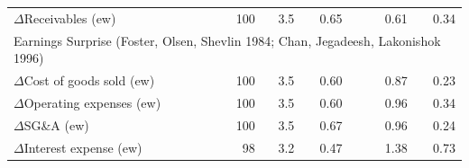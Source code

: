 \begin{tabular}{lrrrlrr}
$\Delta$Receivables (ew) & 100 & 3.5 & 0.65 &  & 0.61 & 0.34 \bigstrut[b] \\ 
\multicolumn{7}{l}{Earnings Surprise (Foster, Olsen, Shevlin 1984; Chan, Jegadeesh, Lakonishok 1996)} \\ \hline
$\Delta$Cost of goods sold (ew) & 100 & 3.5 & 0.60 &  & 0.87 & 0.23\\
$\Delta$Operating expenses (ew) & 100 & 3.5 & 0.60 &  & 0.96 & 0.34\\
$\Delta$SG\&A (ew) & 100 & 3.5 & 0.67 &  & 0.96 & 0.24\\
$\Delta$Interest expense (ew) & 98 & 3.2 & 0.47 &  & 1.38 & 0.73\\
\bottomrule
\end{tabular}
